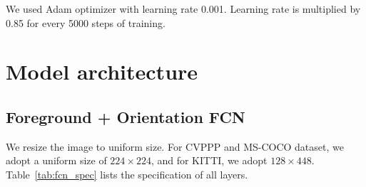 We used Adam optimizer with learning rate 0.001. Learning rate is multiplied by
0.85 for every 5000 steps of training.

\section{Model architecture}

\subsection{Foreground + Orientation FCN}

We resize the image to uniform size. For CVPPP and MS-COCO dataset, we adopt a
uniform size of $224\times224$, and for KITTI, we adopt $128\times448$.
Table~\ref{tab:fcn_spec} lists the specification of all layers.

